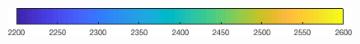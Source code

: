 \documentclass{article}
\begin{document}
\begin{figure}[htp]
\begin{subfigure}{.33\textwidth}
 \label{fig:nutrients2}
\end{subfigure}
\\[+0.2cm]
\begin{subfigure}{.5\textwidth}
 \includegraphics[width=0.95\linewidth]{../Separate_figures/ECOGEM/ocn_ALK_profile_clrbr.png}
\end{subfigure}
\end{figure}
\end{document}
